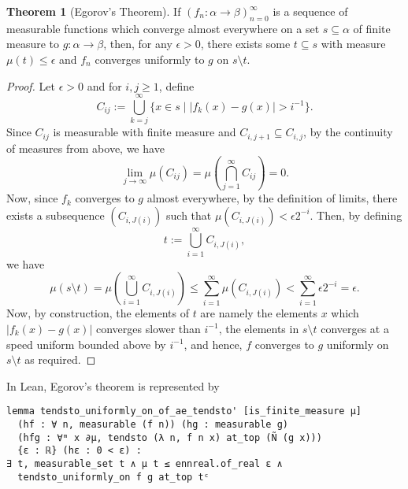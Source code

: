 \documentclass[]{article}
\theoremstyle{definition}
\newtheorem{theorem}{Theorem}
\begin{document}
\begin{theorem}[Egorov's Theorem]
  If \((f_n : \alpha \to \beta)_{n = 0}^\infty\) is a sequence of measurable functions which 
  converge almost everywhere on a set \(s \subseteq \alpha\) of finite measure to 
  \(g : \alpha \to \beta\), then, for any \(\epsilon > 0\), there exists some \(t \subseteq s\) 
  with measure \(\mu(t) \le \epsilon\) and \(f_n\) converges uniformly to \(g\) on 
  \(s \setminus t\). 
\end{theorem}
\begin{proof}
  Let \(\epsilon > 0\) and for \(i, j \ge 1\), define 
  \[C_{ij} := \bigcup_{k = j}^\infty \{x \in s \mid |f_k(x) - g(x)| > i^{-1}\}.\]
  Since \(C_{ij}\) is measurable with finite measure and \(C_{i, j + 1} \subseteq C_{i, j}\), by the 
  continuity of measures from above, we have 
  \[\lim_{j \to \infty} \mu(C_{ij}) = 
    \mu\left(\bigcap_{j = 1}^\infty C_{ij}\right) = 0.\]
  Now, since \(f_k\) converges to \(g\) almost everywhere, by the definition of 
  limits, there exists a subsequence \((C_{i, J(i)})\) such that \(\mu(C_{i, J(i)}) < 
  \epsilon 2^{-i}\). Then, by defining 
  \[t := \bigcup_{i = 1}^\infty C_{i, J(i)},\]
  we have 
  \[\mu(s \setminus t) = \mu\left(\bigcup_{i = 1}^\infty C_{i, J(i)}\right) \le \sum_{i = 1}^\infty \mu(C_{i, J(i)})
    < \sum_{i = 1}^\infty \epsilon 2^{-i} = \epsilon.\]
  Now, by construction, the elements of \(t\) are namely the elements \(x\) 
  which \(|f_k(x) - g(x)|\) converges slower than \(i^{-1}\), the elements in 
  \(s \setminus t\) converges at a speed uniform bounded above by \(i^{-1}\), and 
  hence, \(f\) converges to \(g\) uniformly on \(s \setminus t\) as required.
\end{proof}

In Lean, Egorov's theorem is represented by 
\begin{verbatim}
lemma tendsto_uniformly_on_of_ae_tendsto' [is_finite_measure μ]
  (hf : ∀ n, measurable (f n)) (hg : measurable g)
  (hfg : ∀ᵐ x ∂μ, tendsto (λ n, f n x) at_top (Ñ (g x)))
  {ε : ℝ} (hε : 0 < ε) :
∃ t, measurable_set t ∧ μ t ≤ ennreal.of_real ε ∧
  tendsto_uniformly_on f g at_top tᶜ
\end{verbatim}
\end{document}
